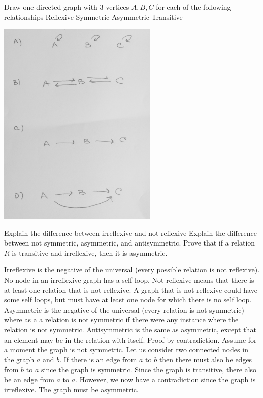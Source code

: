 \documentclass[solution, letterpaper]{cs20inclass}
\begin{document}
\problem
Draw one directed graph with 3 vertices $A, B, C$ for each of the following relationships
\subproblem Reflexive
\subproblem Symmetric
\subproblem Asymmetric
\subproblem Transitive


\begin{solution}
\includegraphics[width=3in]{3NodeGraphs.jpg}



\end{solution}

\problem

\subproblem Explain the difference between irreflexive and not reflexive
\subproblem Explain the difference between not symmetric, asymmetric, and antisymmetric. 
\subproblem Prove that if a relation $R$ is transitive and irreflexive, then it is asymmetric.

\begin{solution}
\subproblem Irreflexive is the negative of the universal (every possible relation is not reflexive). No node in an irreflexive graph has a self loop. Not reflexive means that there is at least one relation that is not reflexive. A graph that is not reflexive could have some self loops, but must have at least one node for which there is no self loop. 
\subproblem Asymmetric is the negative of the universal (every relation is not symmetric) where as a a relation is not symmetric if there were any instance where the relation is not symmetric. Antisymmetric is the same as asymmetric, except that an element may be in the relation with itself.
\subproblem Proof by contradiction. Assume for a moment the graph is not symmetric. Let us consider two connected nodes in the graph $a$ and  $b$. If there is an edge from $a$ to $b$  then there must also be edges from $b$ to $a$ since the graph is symmetric. Since the graph is transitive, there also be an edge from $a$ to $a$. However, we now have a contradiction since the graph is irreflexive. The graph must be asymmetric. 


\end{solution}
\end{document}
